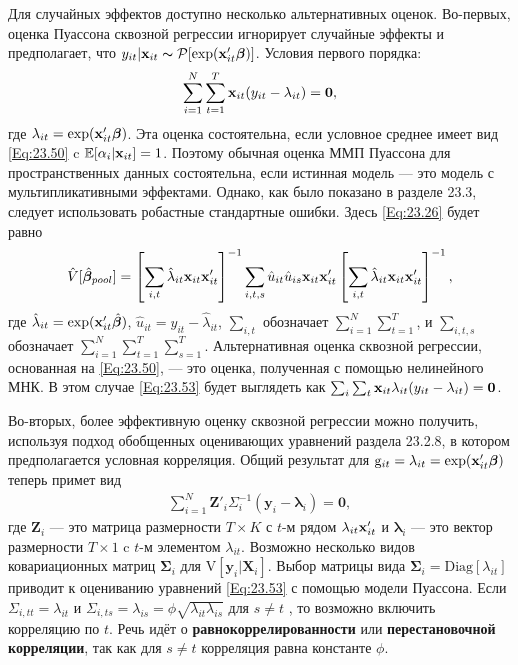 Для случайных эффектов доступно несколько альтернативных оценок. Во-первых, оценка Пуассона сквозной регрессии игнорирует случайные эффекты и предполагает, что $y_{it} | \mathbf{x}_{it} \thicksim \mathcal{P}[\exp (\mathbf{x}'_{it} \bm{\beta})]$. Условия первого порядка:
\begin{align}
\sum^N_{i=1} \sum^T_{t=1} \mathbf{x}_{it} (y_{it} - \lambda_{it})= \mathbf{0},
\label{Eq:23.53}
\end{align}
где $\lambda_{it}=\exp (\mathbf{x}'_{it} \bm{\beta})$. Эта оценка состоятельна, если условное среднее имеет вид \ref{Eq:23.50} c $\mathbb{E} [\alpha_i | \mathbf{x}_{it}]=1$. Поэтому обычная оценка ММП Пуассона для пространственных данных состоятельна, если истинная модель --- это модель с мультипликативными эффектами. Однако, как было показано в разделе 23.3, следует использовать робастные стандартные ошибки. Здесь \ref{Eq:23.26} будет равно
\begin{align}
\hat{V} [\hat{\bm{\beta}}_{pool} ] = 
\left[ \sum_{i,t} \hat{\lambda}_{it} \mathbf{x}_{it} \mathbf{x}'_{it} \right]^{-1}
\sum_{i,t,s} \hat{u}_{it} \hat{u}_{is} \mathbf{x}_{it} \mathbf{x}'_{it}
\left[ \sum_{i,t} \hat{\lambda}_{it} \mathbf{x}_{it} \mathbf{x}'_{it} \right]^{-1},
\label{Eq:23.54}
\end{align}
где $\hat{\lambda}_{it}=\exp (\mathbf{x}'_{it}\hat{\bm{\beta}})$, $\hat{u}_{it}=y_{it}-\hat{\lambda}_{it}$, $\sum_{i,t}$ обозначает $\sum^N_{i=1} \sum^T_{t=1}$, и $\sum_{i,t,s}$ обозначает $\sum^N_{i=1} \sum^T_{t=1} \sum^T_{s=1}$. Альтернативная оценка сквозной регрессии, основанная на \ref{Eq:23.50}, --- это оценка, полученная с помощью нелинейного МНК. В этом случае \ref{Eq:23.53}  будет выглядеть как $\sum_i \sum_t \mathbf{x}_{it} \lambda_{it} (y_{it}-\lambda_{it})=\mathbf{0}$.

Во-вторых, более эффективную оценку сквозной регрессии можно получить, используя  подход обобщенных оценивающих уравнений раздела 23.2.8, в котором предполагается условная корреляция. Общий результат для $\mathrm{g}_{it}=\lambda_{it}=\exp (\mathbf{x}'_{it}\bm{\beta})$ теперь примет вид
\begin{align}
\sum^N_{i=1} \mathbf{Z}'_i \Sigma^{-1}_i (\mathbf{y}_i-\bm\lambda_i)=\mathbf{0},
\label{Eq:23.55}
\end{align}
где $\mathbf{Z}_i$  --- это матрица размерности $T \times K$ с $t$-м рядом  $\lambda_{it}\mathbf{x}'_{it}$ и $\bm\lambda_i$ --- это вектор размерности $T \times 1$ c $t$-м элементом $\lambda_{it}$. Возможно несколько видов ковариационных матриц $\bm\Sigma_i$ для $\mathrm{V}[\mathbf{y}_i|\mathbf{X}_i]$. Выбор матрицы вида $\bm\Sigma_i=\mathrm{Diag}[\lambda_{it}]$ приводит к оцениванию уравнений \ref{Eq:23.53} с помощью модели Пуассона. Если $\Sigma_{i,tt}=\lambda_{it}$ и $\Sigma_{i,ts}=\lambda_{is}=\phi \sqrt{\lambda_{it}\lambda_{is}}$ для $s \neq t$ , то возможно включить корреляцию по $t$. Речь идёт о  \textbf{равнокоррелированности} или \textbf{перестановочной корреляции}, так как для $s \neq t$ корреляция  равна константе $\phi$.

